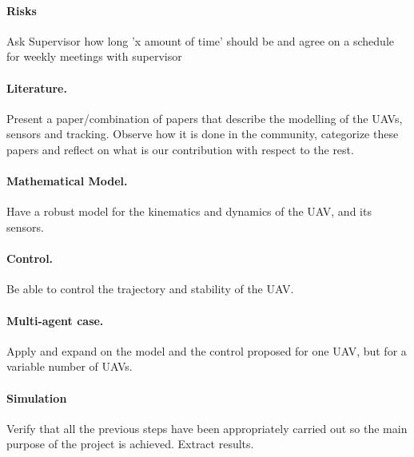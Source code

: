 \documentclass{article}
\begin{document}
		\paragraph{Risks} Ask Supervisor how long 'x amount of time' should be and agree on a schedule for weekly meetings with supervisor
		 
		\paragraph{Literature.} Present a paper/combination of papers that describe the modelling of the UAVs, sensors and tracking. Observe how it is done in the community, categorize these papers and reflect on what is our contribution with respect to the rest. 
		
		\paragraph{Mathematical Model.} Have a robust model for the kinematics and dynamics of the UAV, and its sensors.
			
		\paragraph{Control.} Be able to control the trajectory and stability of the UAV.
			
		\paragraph{	Multi-agent case.} Apply and expand  on the model and the control proposed for one UAV, but for a variable number of UAVs.
		
		\paragraph{Simulation} Verify that all the previous steps have been appropriately carried out so the main purpose of the project is achieved. Extract results.

		
		
\end{document}
